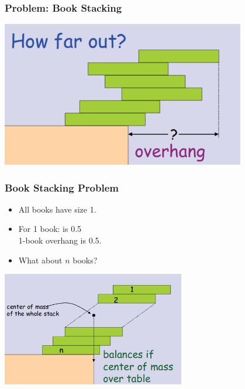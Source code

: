\documentclass{beamer}
\begin{document}
\begin{frame}
  \frametitle{Problem: Book Stacking}

  \begin{center}
    \includegraphics[width=0.8\textwidth]{../img/bookstack1}
  \end{center}
  
\end{frame}

\begin{frame}
  \frametitle{Book Stacking Problem}

  {\large

    \begin{itemize}
    \item All books have size 1.
    \item For 1 book:  is 0.5\\
      \hfill 1-book overhang is 0.5.
      \bigskip
    \item What about $n$ books?
      
    \end{itemize}

    \begin{center}
      \includegraphics[width=0.6\textwidth]{../img/bookstack2}
    \end{center}
  }
\end{frame}
\end{document}
